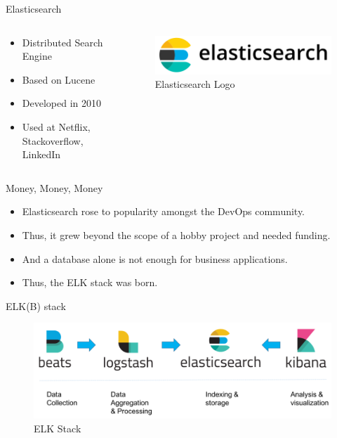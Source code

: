 \documentclass[compress,aspectratio=169]{beamer}
\begin{document}
\begin{frame}{Elasticsearch}
\begin{columns}[T]
\begin{column}{0.5\textwidth}
\begin{itemize}
  \item Distributed Search Engine
  \item Based on Lucene
  \item Developed in 2010
  \item Used at Netflix, Stackoverflow, LinkedIn
\end{itemize}
\end{column}
\begin{column}{0.5\textwidth}
\begin{figure}
  \includegraphics[width=\textwidth]{elasticsearch.png}
  \caption{Elasticsearch Logo}
\end{figure}
\end{column}
\end{columns}
\end{frame}

\begin{frame}{Money, Money, Money}
\begin{itemize}
  \item Elasticsearch rose to popularity amongst the DevOps community.
  \item Thus, it grew beyond the scope of a hobby project and needed funding.
  \item And a database alone is not enough for business applications.
  \item Thus, the ELK stack was born.
\end{itemize}
\end{frame}

\begin{frame}{ELK(B) stack}
\begin{center}
\begin{figure}
  \includegraphics[width=\textwidth]{elk.png}
  \caption{ELK Stack}
\end{figure}
\end{center}
\end{frame}
\end{document}
